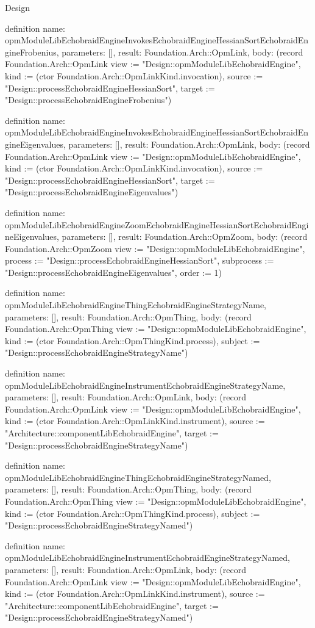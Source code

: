 \begin{lexlean}{Design}
\begin{semanticmodule}
definition{
  name: opmModuleLibEchobraidEngineInvokesEchobraidEngineHessianSortEchobraidEngineFrobenius,
  parameters: [],
  result: Foundation.Arch::OpmLink,
  body: (record Foundation.Arch::OpmLink {view := "Design::opmModuleLibEchobraidEngine", kind := (ctor Foundation.Arch::OpmLinkKind.invocation), source := "Design::processEchobraidEngineHessianSort", target := "Design::processEchobraidEngineFrobenius"})
}

definition{
  name: opmModuleLibEchobraidEngineInvokesEchobraidEngineHessianSortEchobraidEngineEigenvalues,
  parameters: [],
  result: Foundation.Arch::OpmLink,
  body: (record Foundation.Arch::OpmLink {view := "Design::opmModuleLibEchobraidEngine", kind := (ctor Foundation.Arch::OpmLinkKind.invocation), source := "Design::processEchobraidEngineHessianSort", target := "Design::processEchobraidEngineEigenvalues"})
}

definition{
  name: opmModuleLibEchobraidEngineZoomEchobraidEngineHessianSortEchobraidEngineEigenvalues,
  parameters: [],
  result: Foundation.Arch::OpmZoom,
  body: (record Foundation.Arch::OpmZoom {view := "Design::opmModuleLibEchobraidEngine", process := "Design::processEchobraidEngineHessianSort", subprocess := "Design::processEchobraidEngineEigenvalues", order := 1})
}

definition{
  name: opmModuleLibEchobraidEngineThingEchobraidEngineStrategyName,
  parameters: [],
  result: Foundation.Arch::OpmThing,
  body: (record Foundation.Arch::OpmThing {view := "Design::opmModuleLibEchobraidEngine", kind := (ctor Foundation.Arch::OpmThingKind.process), subject := "Design::processEchobraidEngineStrategyName"})
}

definition{
  name: opmModuleLibEchobraidEngineInstrumentEchobraidEngineStrategyName,
  parameters: [],
  result: Foundation.Arch::OpmLink,
  body: (record Foundation.Arch::OpmLink {view := "Design::opmModuleLibEchobraidEngine", kind := (ctor Foundation.Arch::OpmLinkKind.instrument), source := "Architecture::componentLibEchobraidEngine", target := "Design::processEchobraidEngineStrategyName"})
}

definition{
  name: opmModuleLibEchobraidEngineThingEchobraidEngineStrategyNamed,
  parameters: [],
  result: Foundation.Arch::OpmThing,
  body: (record Foundation.Arch::OpmThing {view := "Design::opmModuleLibEchobraidEngine", kind := (ctor Foundation.Arch::OpmThingKind.process), subject := "Design::processEchobraidEngineStrategyNamed"})
}

definition{
  name: opmModuleLibEchobraidEngineInstrumentEchobraidEngineStrategyNamed,
  parameters: [],
  result: Foundation.Arch::OpmLink,
  body: (record Foundation.Arch::OpmLink {view := "Design::opmModuleLibEchobraidEngine", kind := (ctor Foundation.Arch::OpmLinkKind.instrument), source := "Architecture::componentLibEchobraidEngine", target := "Design::processEchobraidEngineStrategyNamed"})
}


\end{semanticmodule}
\end{lexlean}
